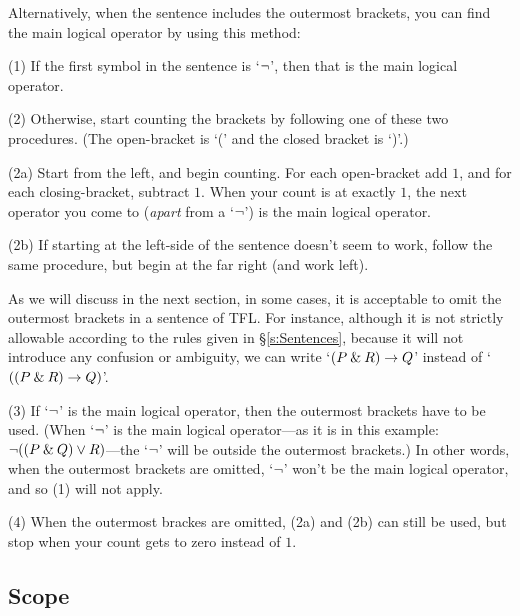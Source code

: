 Alternatively, when the sentence includes the outermost brackets, you can find the main logical operator by using this method:
\begin{ebullet}
	\item[(1)] If the first symbol in the sentence is `${\neg}$', then that is the main logical operator.
	\item[(2)] Otherwise, start counting the brackets by following one of these two procedures. (The open-bracket is `(' and the closed bracket is `)'.) 
	\begin{earg}
	\item[(2a)] Start from the left, and begin counting. For each open-bracket add $1$, and for each closing-bracket, subtract $1$. When your count is at exactly $1$, the next operator you come to (\emph{apart} from a `${\neg}$') is the main logical operator. 
	\item[(2b)] If starting at the left-side of the sentence doesn't seem to work, follow the same procedure, but begin at the far right (and work left). %
	\end{earg}
\end{ebullet}

As we will discuss in the next section, in some cases, it is acceptable to omit the outermost brackets in a sentence of TFL. For instance, although it is not strictly allowable according to the rules given in \S\ref{s:Sentences}, because it will not introduce any confusion or ambiguity, we can write `$(P \mathbin{\&} R) \rightarrow Q$' instead of `$((P \mathbin{\&} R) \rightarrow Q)$'. 

\begin{ebullet}
\item[(3)] If `${\neg}$' is the main logical operator, then the outermost brackets have to be used. (When `${\neg}$' is the main logical operator---as it is in this example: ${\neg}((P \mathbin{\&} Q) \vee R)$---the `${\neg}$' will be outside the outermost brackets.) In other words, when the outermost brackets are omitted, `${\neg}$' won't be the main logical operator, and so (1) will not apply. 
\item[(4)] When the outermost brackes are omitted, (2a) and (2b) can still be used, but stop when your count gets to zero instead of $1$.
\end{ebullet}


\subsection{Scope}

